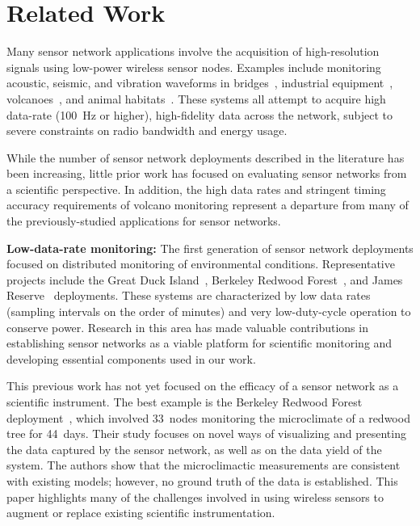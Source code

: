 \section{Related Work}
\label{chapter-relatedwork}



Many sensor network applications involve the acquisition
of high-resolution signals using low-power wireless sensor nodes. Examples
include monitoring acoustic, seismic, and vibration waveforms in
bridges~\cite{ggb-ipsn07}, industrial equipment~\cite{intel-northseasensys}, 
volcanoes~\cite{volcano-osdi06}, and animal
habitats~\cite{girod-ipsn07,enviromic}.  These systems all attempt to acquire
high data-rate (100~Hz or higher), high-fidelity data across the network,
subject to severe constraints on radio bandwidth and energy usage.


While the number of sensor network deployments described in the literature
has been increasing, little prior work has focused on evaluating sensor
networks from a scientific perspective.  In addition, the high data rates and
stringent timing accuracy requirements of volcano monitoring represent a
departure from many of the previously-studied applications for sensor
networks.

{\bf Low-data-rate monitoring:} The first generation of sensor network
deployments focused on distributed monitoring of environmental conditions.
Representative projects include the Great Duck
Island~\cite{spm:04habitat,polastre-masters,mainwaring-habitat}, Berkeley
Redwood Forest~\cite{berkeley-redwoods}, and James
Reserve~\cite{cerpa-habitat} deployments. These systems are characterized by
low data rates (sampling intervals on the order of minutes) and very
low-duty-cycle operation to conserve power.  Research in this area has made
valuable contributions in establishing sensor networks as a viable platform
for scientific monitoring and developing essential components used in our
work. 

This previous work has not yet focused on the efficacy of a sensor network as
a scientific instrument.  The best example is the Berkeley Redwood Forest
deployment~\cite{berkeley-redwoods}, which involved 33~nodes monitoring the
microclimate of a redwood tree for 44~days.  Their study focuses on novel
ways of visualizing and presenting the data captured by the sensor network,
as well as on the data yield of the system. The authors show that the
microclimactic measurements are consistent with existing models; however, no
ground truth of the data is established. This paper highlights many of the
challenges involved in using wireless sensors to augment or replace existing
scientific instrumentation.

